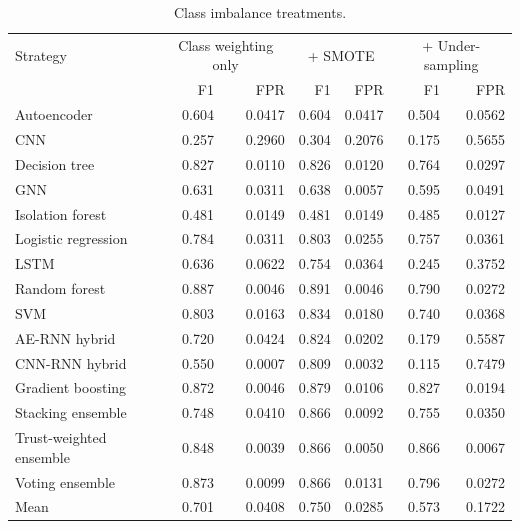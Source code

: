 \begin{table}[H]
\centering
\small
\begin{tabular}{lrrrrrr}
\toprule
Strategy & \multicolumn{2}{c}{Class weighting only} & \multicolumn{2}{c}{+ SMOTE} & \multicolumn{2}{c}{+ Under-sampling} \\
 & F1 & FPR & F1 & FPR & F1 & FPR \\
\midrule
Autoencoder & 0.604 & 0.0417 & 0.604 & 0.0417 & 0.504 & 0.0562 \\
CNN & 0.257 & 0.2960 & 0.304 & 0.2076 & 0.175 & 0.5655 \\
Decision tree & 0.827 & 0.0110 & 0.826 & 0.0120 & 0.764 & 0.0297 \\
GNN & 0.631 & 0.0311 & 0.638 & 0.0057 & 0.595 & 0.0491 \\
Isolation forest & 0.481 & 0.0149 & 0.481 & 0.0149 & 0.485 & 0.0127 \\
Logistic regression & 0.784 & 0.0311 & 0.803 & 0.0255 & 0.757 & 0.0361 \\
LSTM & 0.636 & 0.0622 & 0.754 & 0.0364 & 0.245 & 0.3752 \\
Random forest & 0.887 & 0.0046 & 0.891 & 0.0046 & 0.790 & 0.0272 \\
SVM & 0.803 & 0.0163 & 0.834 & 0.0180 & 0.740 & 0.0368 \\
AE-RNN hybrid & 0.720 & 0.0424 & 0.824 & 0.0202 & 0.179 & 0.5587 \\
CNN-RNN hybrid & 0.550 & 0.0007 & 0.809 & 0.0032 & 0.115 & 0.7479 \\
Gradient boosting & 0.872 & 0.0046 & 0.879 & 0.0106 & 0.827 & 0.0194 \\
Stacking ensemble & 0.748 & 0.0410 & 0.866 & 0.0092 & 0.755 & 0.0350 \\
Trust-weighted ensemble & 0.848 & 0.0039 & 0.866 & 0.0050 & 0.866 & 0.0067 \\
Voting ensemble & 0.873 & 0.0099 & 0.866 & 0.0131 & 0.796 & 0.0272 \\
\midrule
Mean & 0.701 & 0.0408 & 0.750 & 0.0285 & 0.573 & 0.1722 \\
\bottomrule
\end{tabular}
\caption{Class imbalance treatments.}
\label{tab:imbalance}
\end{table}
